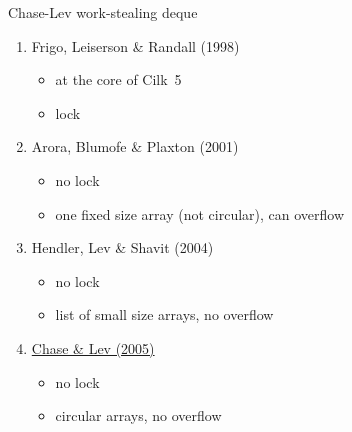 \begin{frame}{Chase-Lev work-stealing deque}
\begin{enumerate}
	\item Frigo, Leiserson \& Randall (1998)
		\begin{itemize}
			\item at the core of Cilk~5
			\item lock
		\end{itemize}
	\item Arora, Blumofe \& Plaxton (2001)
		\begin{itemize}
			\item no lock
			\item one fixed size array (not circular), can overflow
		\end{itemize}
	\item Hendler, Lev \& Shavit (2004)
		\begin{itemize}
			\item no lock
			\item list of small size arrays, no overflow
		\end{itemize}
	\item \underline{Chase \& Lev (2005)}
		\begin{itemize}
			\item no lock
			\item circular arrays, no overflow
		\end{itemize}
\end{enumerate}
\end{frame}